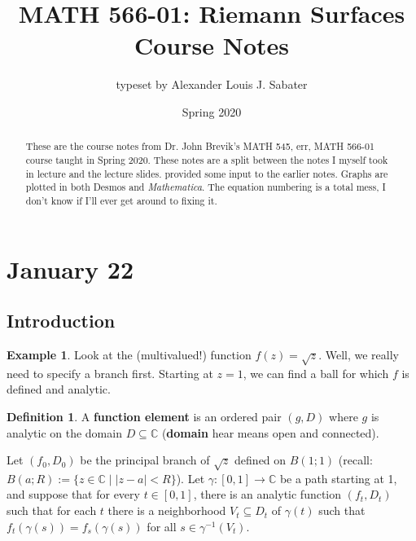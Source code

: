 \documentclass[12pt]{article}
\newcommand{\cx}{\mathbb{C}}
\newcommand{\ita}[1]{\textit{#1}}
\theoremstyle{definition}
\newtheorem{definition}[theorem]{Definition}
\newtheorem{example}[theorem]{Example}
\theoremstyle{remark}
\begin{document}
\date{Spring 2020} 
\author{typeset by Alexander Louis J. Sabater}
\title{MATH 566-01: Riemann Surfaces Course Notes}
\maketitle
\newpage
\tableofcontents
\newpage
\begin{abstract}
    These are the course notes from Dr. John Brevik's MATH 545, err, MATH 566-01 course taught in Spring 2020. These notes are a split between the notes I myself took in lecture and the lecture slides. \cite{Florence} provided some input to the earlier notes. Graphs are plotted in both Desmos and \ita{Mathematica}. The equation numbering is a total mess, I don't know if I'll ever get around to fixing it.
\end{abstract}
\section{January 22}
\subsection{Introduction}
\begin{example}
    Look at the (multivalued!) function $f(z)=\sqrt{z}$. Well, we really need to specify a branch first. Starting at $z=1$, we can find a ball for which $f$ is defined and analytic.
\end{example}
\begin{definition}
    A \textbf{function element} is an ordered pair $(g,D)$ where $g$ is analytic on the domain $D\subseteq\cx$ (\textbf{domain} hear means open and connected).
\end{definition}
Let $(f_0,D_0)$ be the principal branch of $\sqrt{z}$ defined on $B(1;1)$ (recall: $B(a;R):=\{z\in\cx\mid |z-a|<R\}$). Let $\gamma:[0,1]\to\cx$ be a path starting at 1, and suppose that for every $t\in[0,1]$, there is an analytic function $(f_t,D_t)$ such that for each $t$ there is a neighborhood $V_t\subseteq D_t$ of $\gamma(t)$ such that $f_t(\gamma(s))=f_s(\gamma(s))$ for all $s\in\gamma^{-1}(V_t)$.
\end{document}
